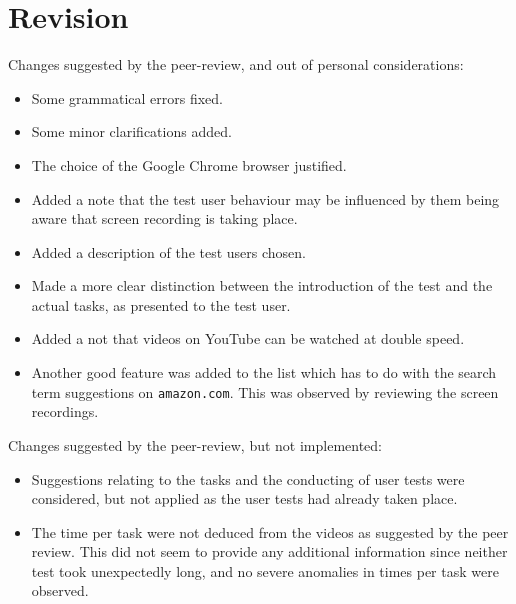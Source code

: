 
\section{Revision}

Changes suggested by the peer-review, and out of personal considerations:

\begin{itemize}

\item Some grammatical errors fixed.

\item Some minor clarifications added.

\item The choice of the Google Chrome browser justified.

\item Added a note that the test user behaviour may be influenced by them being
aware that screen recording is taking place.

\item Added a description of the test users chosen.

\item Made a more clear distinction between the introduction of the test and
the actual tasks, as presented to the test user.

\item Added a not that videos on YouTube can be watched at double speed.

\item Another good feature was added to the list which has to do with the
search term suggestions on \texttt{amazon.com}. This was observed by reviewing
the screen recordings.

\end{itemize}

Changes suggested by the peer-review, but not implemented:

\begin{itemize}

\item Suggestions relating to the tasks and the conducting of user tests were
considered, but not applied as the user tests had already taken place.

\item The time per task were not deduced from the videos as suggested by the
peer review. This did not seem to provide any additional information since
neither test took unexpectedly long, and no severe anomalies in times per task
were observed.

\end{itemize}

